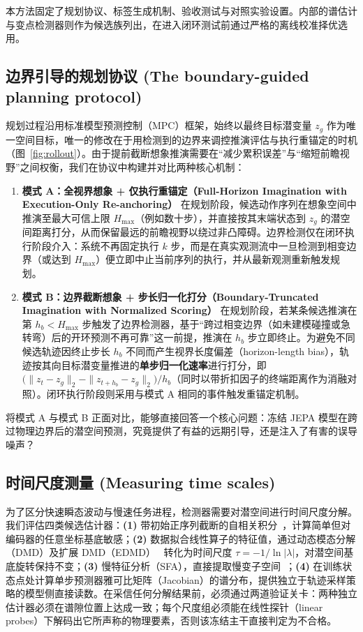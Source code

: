 \documentclass[11pt]{article}
\begin{document}
本方法固定了规划协议、标签生成机制、验收测试与对照实验设置。内部的谱估计与变点检测器则作为候选族列出，在进入闭环测试前通过严格的离线校准择优选用。

\subsection{边界引导的规划协议 (The boundary-guided planning protocol)}

规划过程沿用标准模型预测控制（MPC）框架，始终以最终目标潜变量 $z_g$ 作为唯一空间目标，唯一的修改在于用检测到的边界来调控推演评估与执行重锚定的时机（图~\ref{fig:rollout}）。由于提前截断想象推演需要在“减少累积误差”与“缩短前瞻视野”之间权衡，我们在协议中构建并对比两种核心机制：

\begin{enumerate}[leftmargin=*, nosep]
    \item \textbf{模式 A：全视界想象 + 仅执行重锚定（Full-Horizon Imagination with Execution-Only Re-anchoring）} 在规划阶段，候选动作序列在想象空间中推演至最大可信上限 $H_{\max}$（例如数十步），并直接按其末端状态到 $z_g$ 的潜空间距离打分，从而保留最远的前瞻视野以绕过非凸障碍。边界检测仅在闭环执行阶段介入：系统不再固定执行 $k$ 步，而是在真实观测流中一旦检测到相变边界（或达到 $H_{\max}$）便立即中止当前序列的执行，并从最新观测重新触发规划。
    \item \textbf{模式 B：边界截断想象 + 步长归一化打分（Boundary-Truncated Imagination with Normalized Scoring）} 在规划阶段，若某条候选推演在第 $h_b < H_{\max}$ 步触发了边界检测器，基于“跨过相变边界（如未建模碰撞或急转弯）后的开环预测不再可靠”这一前提，推演在 $h_b$ 步立即终止。为避免不同候选轨迹因终止步长 $h_b$ 不同而产生视界长度偏差（horizon-length bias），轨迹按其向目标潜变量推进的\textbf{单步归一化速率}进行打分，即 $\big(\|z_t - z_g\|_2 - \|z_{t+h_b} - z_g\|_2\big)/h_b$（同时以带折扣因子的终端距离作为消融对照）。闭环执行阶段则采用与模式 A 相同的事件触发重锚定机制。
\end{enumerate}

将模式 A 与模式 B 正面对比，能够直接回答一个核心问题：冻结 JEPA 模型在跨过物理边界后的潜空间预测，究竟提供了有益的远期引导，还是注入了有害的误导噪声？

\subsection{时间尺度测量 (Measuring time scales)}

为了区分快速瞬态波动与慢速任务进程，检测器需要对潜空间进行时间尺度分解。我们评估四类候选估计器：\textbf{(1)} 带初始正序列截断的自相关积分~\cite{geyer92}，计算简单但对编码器的任意坐标基底敏感；\textbf{(2)} 数据拟合线性算子的特征值，通过动态模态分解（DMD）及扩展 DMD（EDMD）~\cite{dmd,koopman_edmd,arbabi17} 转化为时间尺度 $\tau = -1/\ln|\lambda|$，对潜空间基底旋转保持不变；\textbf{(3)} 慢特征分析（SFA），直接提取慢变子空间~\cite{sfa}；\textbf{(4)} 在训练状态点处计算单步预测器雅可比矩阵（Jacobian）的谱分布，提供独立于轨迹采样策略的模型侧直接读数。在采信任何分解结果前，必须通过两道验证关卡：两种独立估计器必须在谱隙位置上达成一致；每个尺度组必须能在线性探针（linear probes）下解码出它所声称的物理要素，否则该冻结主干直接判定为不合格。
\end{document}
